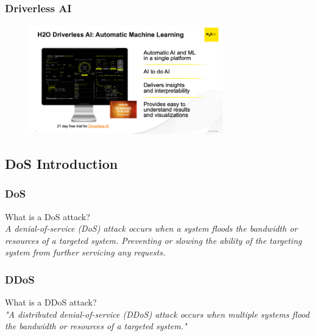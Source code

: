 \documentclass[11pt,
               aspectratio=169,
               hyperref={colorlinks}
               ]{beamer}
\begin{document}
	\begin{frame}
		\frametitle{Driverless AI}
		\begin{figure}[htb]
			\begin{center}
				\includegraphics[width=0.75\textwidth]{img/dai.png}
				\label{fig:dai}
			\end{center}
		\end{figure}
	\end{frame}
	\subsection{DoS Introduction}
	\begin{frame}
		\frametitle{DoS}
        What is a DoS attack?\\
            \textit{A denial-of-service (DoS) attack occurs when a system floods the bandwidth or resources of a targeted system. Preventing or slowing the ability of the targeting system from further servicing any requests.}

	\end{frame}
	\begin{frame}
		\frametitle{DDoS}
        What is a DDoS attack?\\
            \textit{"A distributed denial-of-service (DDoS) attack occurs when multiple systems flood the bandwidth or resources of a targeted system."}
	\end{frame}
\end{document}
